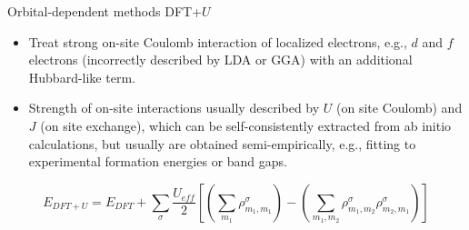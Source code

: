 \documentclass[aspectratio=169]{beamer}
\begin{document}
\begin{frame}{Orbital-dependent methods}
DFT+$U$\cite{anisimovBandTheoryMott1991,anisimovDensityFunctionalTheoryNio1993,dudarevElectronenergylossSpectraStructural1998}
\begin{itemize}
    \item Treat strong on-site Coulomb interaction of localized electrons, e.g., $d$ and $f$ electrons (incorrectly described by LDA or GGA) with an additional Hubbard-like term. 
    \item Strength of on-site interactions usually described by $U$ (on site Coulomb) and $J$ (on site exchange), which can be self-consistently extracted from ab initio calculations,\cite{cococcioniLinearResponseApproach2005} but usually are obtained semi-empirically, e.g., fitting to experimental formation energies or band gaps.
\end{itemize}
\begin{equation*}
    E_{DFT+U} = E_{DFT} + \sum_\sigma \frac{U_{eff}}{2} \left[ \left( \sum_{m_1} \rho_{m_1,m_1}^\sigma \right) - \left( \sum_{m_1,m_2} \rho_{m_1,m_2}^\sigma\rho_{m_2,m_1}^\sigma \right)  \right]
\end{equation*}

\end{frame} 
\end{document}
